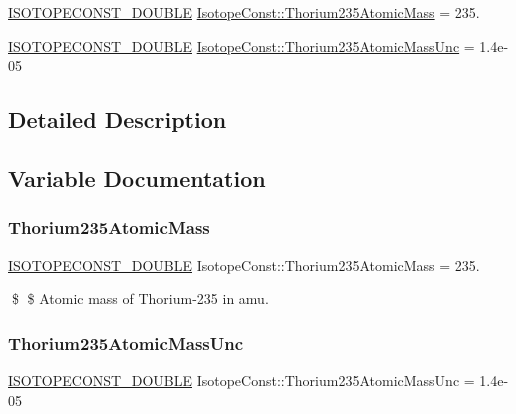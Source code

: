 \begin{DoxyCompactItemize}
\item 
\mbox{\hyperlink{group___isotope_const-_macros_ga8f45a7272ce02c0b4c65c44636ed719a}{I\+S\+O\+T\+O\+P\+E\+C\+O\+N\+S\+T\+\_\+\+D\+O\+U\+B\+LE}} \mbox{\hyperlink{group___isotope_const-_thorium-_th235_ga56bb2fa66cc23b603e6d2e40f539a43e}{Isotope\+Const\+::\+Thorium235\+Atomic\+Mass}} = 235.
\item 
\mbox{\hyperlink{group___isotope_const-_macros_ga8f45a7272ce02c0b4c65c44636ed719a}{I\+S\+O\+T\+O\+P\+E\+C\+O\+N\+S\+T\+\_\+\+D\+O\+U\+B\+LE}} \mbox{\hyperlink{group___isotope_const-_thorium-_th235_gacfaef98714608b11eca6a469325ffaad}{Isotope\+Const\+::\+Thorium235\+Atomic\+Mass\+Unc}} = 1.\+4e-\/05
\end{DoxyCompactItemize}


\subsection{Detailed Description}


\subsection{Variable Documentation}
\mbox{\label{group___isotope_const-_thorium-_th235_ga56bb2fa66cc23b603e6d2e40f539a43e}} 
\subsubsection{\texorpdfstring{Thorium235\+Atomic\+Mass}{Thorium235AtomicMass}}
{\footnotesize\ttfamily \mbox{\hyperlink{group___isotope_const-_macros_ga8f45a7272ce02c0b4c65c44636ed719a}{I\+S\+O\+T\+O\+P\+E\+C\+O\+N\+S\+T\+\_\+\+D\+O\+U\+B\+LE}} Isotope\+Const\+::\+Thorium235\+Atomic\+Mass = 235.}

\$ \$ Atomic mass of Thorium-\/235 in amu. \mbox{\label{group___isotope_const-_thorium-_th235_gacfaef98714608b11eca6a469325ffaad}} 
\subsubsection{\texorpdfstring{Thorium235\+Atomic\+Mass\+Unc}{Thorium235AtomicMassUnc}}
{\footnotesize\ttfamily \mbox{\hyperlink{group___isotope_const-_macros_ga8f45a7272ce02c0b4c65c44636ed719a}{I\+S\+O\+T\+O\+P\+E\+C\+O\+N\+S\+T\+\_\+\+D\+O\+U\+B\+LE}} Isotope\+Const\+::\+Thorium235\+Atomic\+Mass\+Unc = 1.\+4e-\/05}

